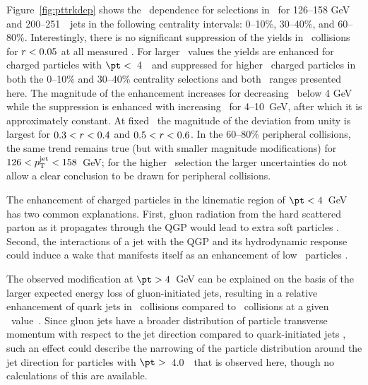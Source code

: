Figure~\ref{fig:pttrkdep} shows the \pt\ dependence for selections in \rvar\  for 126--158 GeV and 200--251~\GeV\ jets in the following centrality intervals: 0--10\%, 30--40\%, and 60--80\%.
Interestingly, there is no significant suppression of the yields in \pbpb\ collisions for $\mbox{$r$} < 0.05$ at all measured \pt.
For larger \rvar\ values the yields are enhanced for charged particles with $\pt <$~4~\GeV\ and suppressed for higher \pt\ charged particles in both the 0--10\% and 30--40\% centrality selections and both \ptjet\  ranges presented here.
The magnitude of the enhancement increases for decreasing \pt\ below 4 GeV while the suppression is enhanced with increasing \pt\ for \mbox{4--10 GeV}, after which it is approximately constant.
At fixed \pt\ the magnitude of the deviation from unity is largest for $0.3< \mbox{$r$} < 0.4$ and $0.5< \mbox{$r$} < 0.6$.
In the 60--80\% peripheral collisions, the same trend remains true (but with smaller magnitude modifications) for \mbox{$126 < \mbox{$p_{\mathrm{T}}^{\mathrm{jet}}$} < 158$ GeV}; for the higher \ptjet\ selection the larger uncertainties do not allow a clear conclusion to be drawn for peripheral collisions.

The enhancement of charged particles in the kinematic region of \mbox{$\pt < 4$ GeV} has two common explanations.
First, gluon radiation from the hard scattered parton as it propagates through the QGP would lead to extra soft particles \cite{Chien:2015vja, Kang:2017frl}.
Second, the interactions of a jet with the QGP and its hydrodynamic response could induce a wake that manifests itself as an enhancement of low \pt\ particles \cite{Tachibana:2017syd}.

The observed modification at \mbox{$\pt > 4$ GeV} can be explained on the basis of the larger expected energy loss of gluon-initiated jets, resulting in a relative enhancement of quark jets in \pbpb\ collisions compared to \pp\ collisions at a given \ptjet\ value~\cite{Aaboud:2018hpb, Spousta:2015fca}.
Since gluon jets have a broader distribution of particle transverse momentum with respect to the jet direction compared to quark-initiated jets \cite{OPAL:1995ab}, such an effect could describe the narrowing of the particle distribution around the jet direction for particles with $\pt >$~4.0~\GeV\ that is observed here, though no calculations of this are available.


